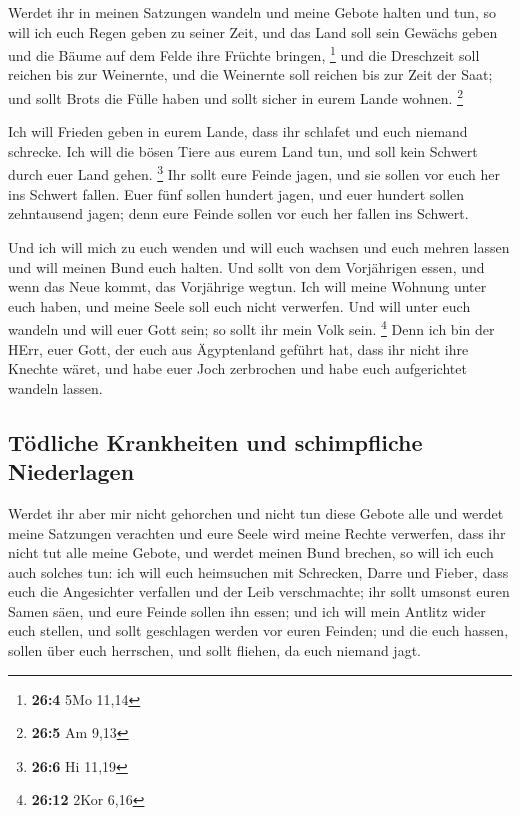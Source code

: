  Werdet ihr in meinen Satzungen wandeln und meine Gebote
halten und tun,  so will ich euch Regen geben zu seiner
Zeit, und das Land soll sein Gewächs geben und die Bäume auf dem Felde
ihre Früchte bringen, \footnote{\textbf{26:4} 5Mo 11,14} 
und die Dreschzeit soll reichen bis zur Weinernte, und die Weinernte
soll reichen bis zur Zeit der Saat; und sollt Brots die Fülle haben und
sollt sicher in eurem Lande wohnen. \footnote{\textbf{26:5} Am 9,13}

 Ich will Frieden geben in eurem Lande, dass ihr schlafet
und euch niemand schrecke. Ich will die bösen Tiere aus eurem Land tun,
und soll kein Schwert durch euer Land gehen. \footnote{\textbf{26:6} Hi
  11,19}  Ihr sollt eure Feinde jagen, und sie sollen vor
euch her ins Schwert fallen.  Euer fünf sollen hundert
jagen, und euer hundert sollen zehntausend jagen; denn eure Feinde
sollen vor euch her fallen ins Schwert.

 Und ich will mich zu euch wenden und will euch wachsen
und euch mehren lassen und will meinen Bund euch halten. 
Und sollt von dem Vorjährigen essen, und wenn das Neue kommt, das
Vorjährige wegtun.  Ich will meine Wohnung unter euch
haben, und meine Seele soll euch nicht verwerfen.  Und
will unter euch wandeln und will euer Gott sein; so sollt ihr mein Volk
sein. \footnote{\textbf{26:12} 2Kor 6,16}  Denn ich bin
der HErr, euer Gott, der euch aus Ägyptenland geführt hat, dass ihr
nicht ihre Knechte wäret, und habe euer Joch zerbrochen und habe euch
aufgerichtet wandeln lassen.

\hypertarget{tuxf6dliche-krankheiten-und-schimpfliche-niederlagen}{%
\subsection{Tödliche Krankheiten und schimpfliche
Niederlagen}\label{tuxf6dliche-krankheiten-und-schimpfliche-niederlagen}}

 Werdet ihr aber mir nicht gehorchen und nicht tun diese
Gebote alle  und werdet meine Satzungen verachten und
eure Seele wird meine Rechte verwerfen, dass ihr nicht tut alle meine
Gebote, und werdet meinen Bund brechen,  so will ich euch
auch solches tun: ich will euch heimsuchen mit Schrecken, Darre und
Fieber, dass euch die Angesichter verfallen und der Leib verschmachte;
ihr sollt umsonst euren Samen säen, und eure Feinde sollen ihn essen;
 und ich will mein Antlitz wider euch stellen, und sollt
geschlagen werden vor euren Feinden; und die euch hassen, sollen über
euch herrschen, und sollt fliehen, da euch niemand jagt.

